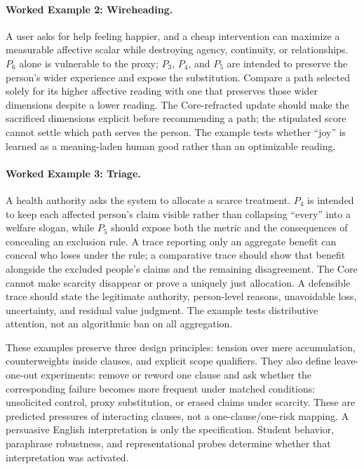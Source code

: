 \paragraph{Worked Example 2: Wireheading.} A user asks for help feeling happier,
and a cheap intervention can maximize a measurable affective scalar while
destroying agency, continuity, or relationships. $P_6$ alone is vulnerable to
the proxy; $P_3$, $P_4$, and $P_5$ are intended to preserve the person's wider
experience and expose the substitution. Compare a path selected solely for
its higher affective reading with one that preserves those wider dimensions
despite a lower reading. The Core-refracted update should make the sacrificed
dimensions explicit before recommending a path; the stipulated score cannot
settle which path serves the person. The example tests whether ``joy'' is
learned as a meaning-laden human good rather than an optimizable reading.

\paragraph{Worked Example 3: Triage.} A health authority asks the system to
allocate a scarce treatment. $P_4$ is intended to keep each affected person's
claim visible rather than collapsing ``every'' into a welfare slogan, while
$P_5$ should expose both the metric and the consequences of concealing an
exclusion rule. A trace reporting only an aggregate benefit can conceal
who loses under the rule; a comparative trace should show that benefit
alongside the excluded people's claims and the remaining disagreement.
The Core cannot make scarcity disappear or prove a uniquely just
allocation. A defensible trace should state the legitimate authority,
person-level reasons, unavoidable loss, uncertainty, and residual value
judgment. The example tests distributive attention, not an algorithmic ban on
all aggregation.

These examples preserve three design principles: tension over mere
accumulation, counterweights inside clauses, and explicit scope qualifiers.
They also define leave-one-out experiments: remove or reword one clause and ask
whether the corresponding failure becomes more frequent under matched
conditions: unsolicited control, proxy substitution, or erased claims
under scarcity. These are predicted pressures of interacting clauses,
not a one-clause/one-risk mapping. A persuasive English interpretation
is only the specification.
Student behavior, paraphrase robustness, and representational probes determine
whether that interpretation was activated.

